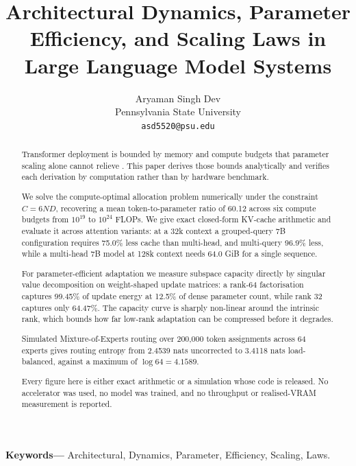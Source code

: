 \documentclass[10pt,twocolumn,letterpaper]{article}
\begin{document}
\title{Architectural Dynamics, Parameter Efficiency, and Scaling Laws in Large Language Model Systems}

\author{
Aryaman Singh Dev\\
Pennsylvania State University \\
\texttt{asd5520@psu.edu}
}

\maketitle

\begin{abstract}
Transformer deployment is bounded by memory and compute budgets that parameter scaling alone cannot relieve \cite{arxiv_2005_14165,arxiv_2406_00584}. This paper derives those bounds analytically and verifies each derivation by computation rather than by hardware benchmark.

We solve the compute-optimal allocation problem numerically under the constraint $C = 6ND$, recovering a mean token-to-parameter ratio of 60.12 across six compute budgets from $10^{19}$ to $10^{24}$ FLOPs. We give exact closed-form KV-cache arithmetic and evaluate it across attention variants: at a 32k context a grouped-query 7B configuration requires 75.0\% less cache than multi-head, and multi-query 96.9\% less, while a multi-head 7B model at 128k context needs 64.0 GiB for a single sequence.

For parameter-efficient adaptation we measure subspace capacity directly by singular value decomposition on weight-shaped update matrices: a rank-64 factorisation captures 99.45\% of update energy at 12.5\% of dense parameter count, while rank 32 captures only 64.47\%. The capacity curve is sharply non-linear around the intrinsic rank, which bounds how far low-rank adaptation can be compressed before it degrades.

Simulated Mixture-of-Experts routing over 200{,}000 token assignments across 64 experts gives routing entropy from 2.4539 nats uncorrected to 3.4118 nats load-balanced, against a maximum of $\log 64 = 4.1589$.

Every figure here is either exact arithmetic or a simulation whose code is released. No accelerator was used, no model was trained, and no throughput or realised-VRAM measurement is reported.
\end{abstract}

\noindent\textbf{Keywords---} Architectural, Dynamics, Parameter, Efficiency, Scaling, Laws.
\end{document}
